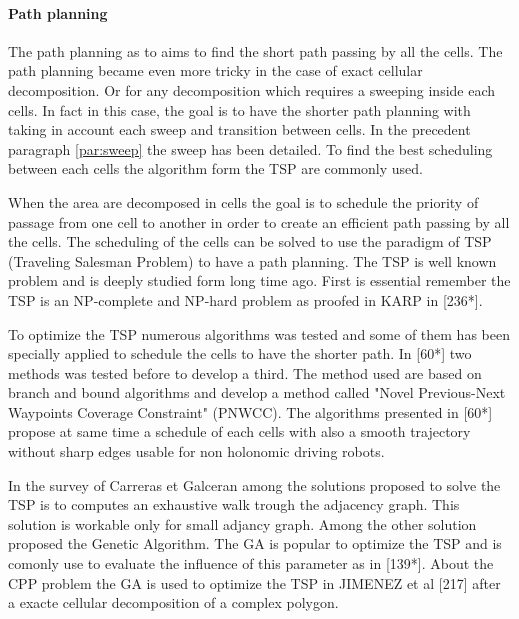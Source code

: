  

 
 \paragraph*{Path planning} \label{par:TSPPathPlan}
 
 The path planning as to aims to find the short path passing by all the cells. The path planning became even more tricky in the case of exact cellular decomposition. Or for any decomposition which requires a sweeping inside each cells. In fact in this case, the goal is to have the shorter path planning with taking in account each sweep and transition between cells. In the precedent paragraph \ref{par:sweep} the sweep has been detailed.
 To find the best scheduling between each cells the algorithm form the TSP are commonly used.     
 
 When the area are decomposed in cells the goal is to schedule the priority of passage from one cell to another in order to create an efficient path passing by all the cells. The scheduling of the cells can be solved to use the paradigm of TSP (Traveling Salesman Problem) to have a path planning. 
The TSP is well known problem and is  deeply studied form long time ago.  First is essential remember the TSP is an NP-complete and NP-hard problem as proofed in KARP in [236*]. 

To optimize the TSP numerous algorithms was tested and some of them has been specially applied to schedule the cells to have the shorter path. In [60*] two methods was tested before to develop a third. The method used are based on branch and bound algorithms and develop a method called "Novel Previous-Next Waypoints Coverage Constraint" (PNWCC). The algorithms presented in [60*] propose at same time a schedule of each cells with also a smooth trajectory without sharp edges usable for non holonomic driving robots. 

	In the survey of Carreras et Galceran \citep{66*galceran2013} among the solutions proposed to solve the   TSP is to computes an exhaustive walk trough the adjacency graph. This solution is workable only for small adjancy graph. Among the other solution proposed the Genetic Algorithm. The GA is popular to optimize the TSP and is comonly use to evaluate the influence of this parameter as in \citep{68*muhlenbein1989} \citep{80*serpell2010} [139*]. About the CPP problem the GA is used to optimize the TSP in JIMENEZ et al [217] after a exacte cellular decomposition of a complex polygon. 
	
